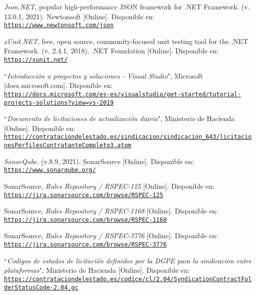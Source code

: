 \begin{thebibliography}{X}
            \textit{Json.NET}, popular high-performance JSON framework for .NET Framework. (v. 13.0.1, 2021). Newtonsoft [Online]. Disponible en:
            \\ \texttt{\url{https://www.newtonsoft.com/json}}
        
            \textit{xUnit.NET},  free, open source, community-focused unit testing tool for the .NET Framework. (v. 2.4.1, 2018). .NET Foundation [Online]. Disponible en:
            \\ \texttt{\url{https://xunit.net/}}
        
            ``\textit{Introducción a proyectos y soluciones - Visual Studio}", Microsoft [docs.microsoft.com]. Disponible en:
            \\ \texttt{\url{https://docs.microsoft.com/es-es/visualstudio/get-started/tutorial-projects-solutions?view=vs-2019}}
        
            ``\textit{Documento de licitaciones de actualización diaria}", Ministerio de Hacienda [Online]. Disponible en:
            \\ \texttt{\url{https://contrataciondelestado.es/sindicacion/sindicacion_643/licitacionesPerfilesContratanteCompleto3.atom}}
            
            \textit{SonarQube}. (v.8.9, 2021). SonarSource [Online]. Disponible en:
            \\ \texttt{\url{https://www.sonarqube.org/}}
            
            SonarSource, \textit{Rules Repository / RSPEC-125} [Online]. Disponible en:
            \\ \texttt{\url{https://jira.sonarsource.com/browse/RSPEC-125}}
            
            SonarSource, \textit{Rules Repository / RSPEC-1168} [Online]. Disponible en:
            \\ \texttt{\url{https://jira.sonarsource.com/browse/RSPEC-1168}}
            
            SonarSource, \textit{Rules Repository / RSPEC-3776} [Online]. Disponible en:
            \\ \texttt{\url{https://jira.sonarsource.com/browse/RSPEC-3776}}
        
              ``\textit{Codigos de estados de licitación definidos por la DGPE para la sindicacion entre plataformas}", Ministerio de Hacienda [Online]. Disponible en:
            \\ \texttt{\url{https://contrataciondelestado.es/codice/cl/2.04/SyndicationContractFolderStatusCode-2.04.gc}}
            

\end{thebibliography}
